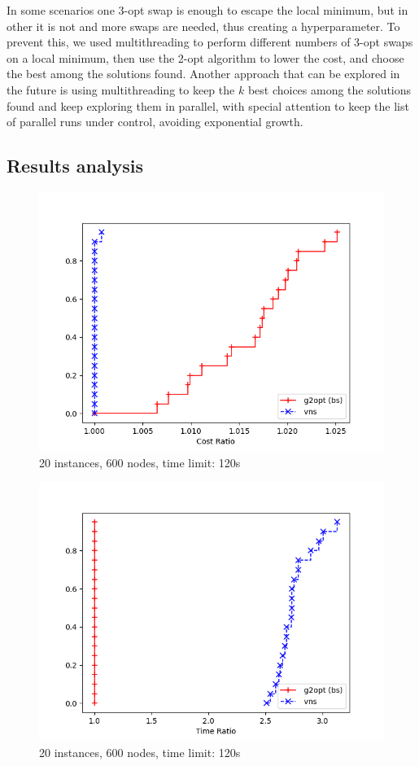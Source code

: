In some scenarios one 3-opt swap is enough to escape the local minimum, but in other it is not and more swaps are needed, thus creating a hyperparameter. To prevent this, we used multithreading to perform different numbers of 3-opt swaps on a local minimum, then use the 2-opt algorithm to lower the cost, and choose the best among the solutions found. Another approach that can be explored in the future is using multithreading to keep the $k$ best choices among the solutions found and keep exploring them in parallel, with special attention to keep the list of parallel runs under control, avoiding exponential growth.

\subsection{Results analysis}

\FloatBarrier
\begin{figure}[h]
    \centering
    \includegraphics*[width=.6\textwidth]{../plots/perfprof_vns_costs.png}
    \caption*{20 instances, 600 nodes, time limit: 120s}
\end{figure}

\begin{figure}[h]
    \centering
    \includegraphics*[width=.6\textwidth]{../plots/perfprof_vns_times.png}
    \caption*{20 instances, 600 nodes, time limit: 120s}
\end{figure}
\FloatBarrier

